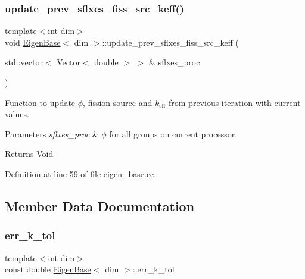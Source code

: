 \subsubsection{\texorpdfstring{update\+\_\+prev\+\_\+sflxes\+\_\+fiss\+\_\+src\+\_\+keff()}{update\_prev\_sflxes\_fiss\_src\_keff()}}
{\footnotesize\ttfamily template$<$int dim$>$ \\
void \hyperlink{class_eigen_base}{Eigen\+Base}$<$ dim $>$\+::update\+\_\+prev\+\_\+sflxes\+\_\+fiss\+\_\+src\+\_\+keff (\begin{DoxyParamCaption}\item[{std\+::vector$<$ Vector$<$ double $>$ $>$ \&}]{sflxes\+\_\+proc }\end{DoxyParamCaption})\hspace{0.3cm}{\ttfamily [virtual]}}

Function to update $\phi$, fission source and $k_\mathrm{eff}$ from previous iteration with current values.


\begin{DoxyParams}{Parameters}
{\em sflxes\+\_\+proc} & $\phi$ for all groups on current processor. \\
\hline
\end{DoxyParams}
\begin{DoxyReturn}{Returns}
Void 
\end{DoxyReturn}


Definition at line 59 of file eigen\+\_\+base.\+cc.



\subsection{Member Data Documentation}
\mbox{\label{class_eigen_base_af082247a6dec17c46fd664a780d9a765}} 
\subsubsection{\texorpdfstring{err\+\_\+k\+\_\+tol}{err\_k\_tol}}
{\footnotesize\ttfamily template$<$int dim$>$ \\
const double \hyperlink{class_eigen_base}{Eigen\+Base}$<$ dim $>$\+::err\+\_\+k\+\_\+tol\hspace{0.3cm}{\ttfamily [protected]}}



